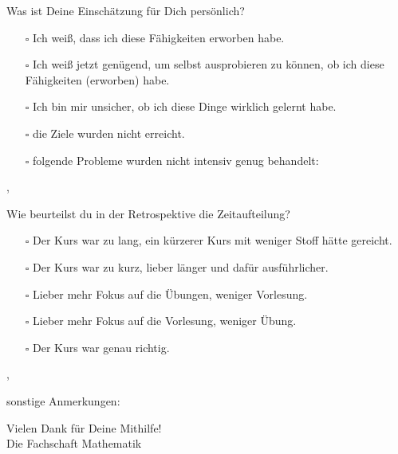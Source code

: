 Was ist Deine Einschätzung für Dich persönlich?
\begin{itemize}
	\item[$\square$]
		Ich weiß, dass ich diese Fähigkeiten erworben habe.
	\item[$\square$]
		Ich weiß jetzt genügend, um selbst ausprobieren zu können, ob ich diese
		Fähigkeiten (erworben) habe.
	\item[$\square$]
		Ich bin mir unsicher, ob ich diese Dinge wirklich gelernt habe.
	\item[$\square$]
		die Ziele wurden nicht erreicht.
	\item[$\square$]
		folgende Probleme wurden nicht intensiv genug behandelt: \hrulefill

		\hrulefill

		\hrulefill

		\hrulefill
\end{itemize}

\sep 

Wie beurteilst du in der Retrospektive die Zeitaufteilung?
\begin{itemize}
	\item[$\square$]
		Der Kurs war zu lang, ein kürzerer Kurs mit weniger Stoff hätte gereicht.
	\item[$\square$]
		Der Kurs war zu kurz, lieber länger und dafür ausführlicher.
	\item[$\square$]
		Lieber mehr Fokus auf die Übungen, weniger Vorlesung.
	\item[$\square$]
		Lieber mehr Fokus auf die Vorlesung, weniger Übung.
	\item[$\square$]
		Der Kurs war genau richtig.                
\end{itemize}

\sep

sonstige Anmerkungen:  \hrulefill

		\hrulefill

		\hrulefill

		\hrulefill

\vfill

\begin{flushright}
	Vielen Dank für Deine Mithilfe! \\
	Die Fachschaft Mathematik
\end{flushright}



